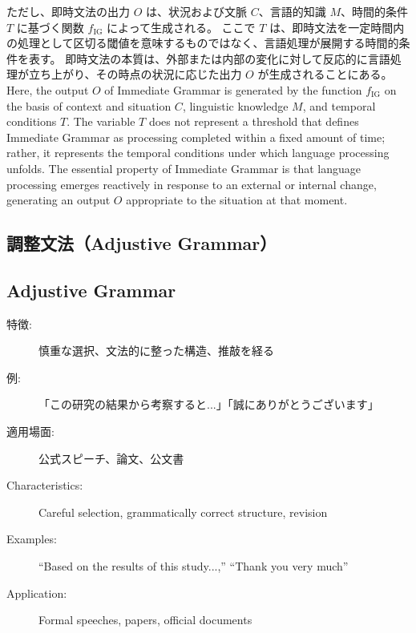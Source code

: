 \documentclass[a4paper]{article}
\begin{document}
\ifJPN
ただし、即時文法の出力 \( O \) は、状況および文脈 \( C \)、言語的知識 \( M \)、時間的条件 \( T \) に基づく関数 \( f_{\text{IG}} \) によって生成される。
ここで \( T \) は、即時文法を一定時間内の処理として区切る閾値を意味するものではなく、言語処理が展開する時間的条件を表す。
即時文法の本質は、外部または内部の変化に対して反応的に言語処理が立ち上がり、その時点の状況に応じた出力 \( O \) が生成されることにある。
\else
Here, the output \( O \) of Immediate Grammar is generated by the function \( f_{\text{IG}} \) on the basis of context and situation \( C \), linguistic knowledge \( M \), and temporal conditions \( T \).
The variable \( T \) does not represent a threshold that defines Immediate Grammar as processing completed within a fixed amount of time; rather, it represents the temporal conditions under which language processing unfolds.
The essential property of Immediate Grammar is that language processing emerges reactively in response to an external or internal change, generating an output \( O \) appropriate to the situation at that moment.
\fi

\ifJPN
  \subsection{調整文法（Adjustive Grammar）}
\else
  \subsection{Adjustive Grammar}
\fi

\ifJPN
  \begin{description}
    \item[特徴:] 慎重な選択、文法的に整った構造、推敲を経る
    \item[例:] 「この研究の結果から考察すると...」「誠にありがとうございます」
    \item[適用場面:] 公式スピーチ、論文、公文書
  \end{description}
\else
  \begin{description}
    \item[Characteristics:] Careful selection, grammatically correct structure, revision
    \item[Examples:] ``Based on the results of this study...,'' ``Thank you very much''
    \item[Application:] Formal speeches, papers, official documents
  \end{description}
\fi

%
\end{document}

